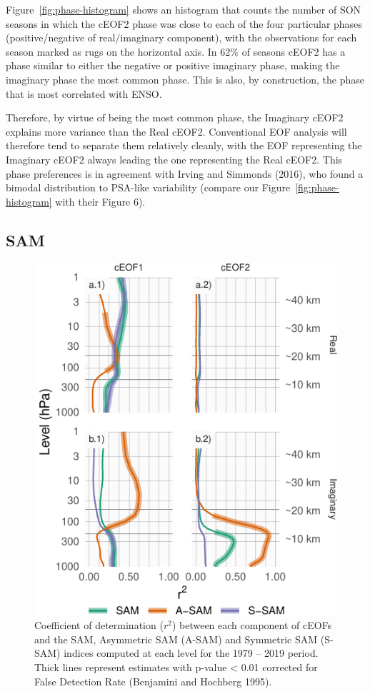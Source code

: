 \documentclass[smallextended]{svjour3}       %
\begin{document}
Figure~\ref{fig:phase-histogram} shows an histogram that counts the number of SON seasons in which the cEOF2 phase was close to each of the four particular phases (positive/negative of real/imaginary component), with the observations for each season marked as rugs on the horizontal axis.
In 62\% of seasons cEOF2 has a phase similar to either the negative or positive imaginary phase, making the imaginary phase the most common phase.
This is also, by construction, the phase that is most correlated with ENSO.

Therefore, by virtue of being the most common phase, the Imaginary cEOF2 explains more variance than the Real cEOF2.
Conventional EOF analysis will therefore tend to separate them relatively cleanly, with the EOF representing the Imaginary cEOF2 always leading the one representing the Real cEOF2.
This phase preferences is in agreement with Irving and Simmonds (2016), who found a bimodal distribution to PSA-like variability (compare our Figure~\ref{fig:phase-histogram} with their Figure 6).

\hypertarget{sam}{%
\subsection{SAM}\label{sam}}



\begin{figure}
\centering
\includegraphics{../figures/sam-eof-vertical-1.pdf}
\caption{\label{fig:sam-eof-vertical}Coefficient of determination (\(r^2\)) between each component of cEOFs and the SAM, Asymmetric SAM (A-SAM) and Symmetric SAM (S-SAM) indices computed at each level for the 1979 -- 2019 period. Thick lines represent estimates with p-value \textless{} 0.01 corrected for False Detection Rate (Benjamini and Hochberg 1995).}
\end{figure}
\end{document}

